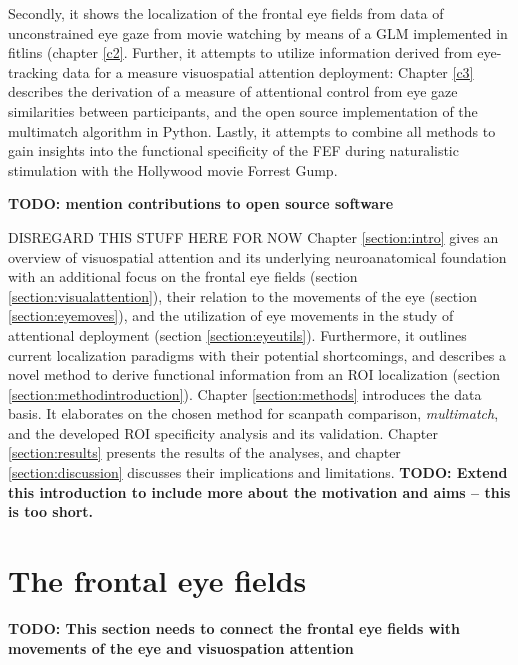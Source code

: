 \documentclass[a4paper, 12pt]{scrreprt}
\begin{document}
Secondly, it shows  the localization of the frontal eye fields from data of unconstrained eye gaze from movie watching by means of a GLM implemented in fitlins (chapter \ref{c2}. Further, it attempts to utilize information derived from eye-tracking data for a measure visuospatial attention deployment: Chapter \ref{c3} describes the derivation of a measure of attentional control from eye gaze similarities between participants, and the open source implementation of the multimatch algorithm in Python. Lastly, it attempts to combine all methods to gain insights into the functional specificity of the FEF during naturalistic stimulation with the Hollywood movie Forrest Gump. \newline


\textbf{TODO: mention contributions to open source software}

DISREGARD THIS STUFF HERE FOR NOW
Chapter \ref{section:intro} gives an overview of visuospatial attention and its underlying neuroanatomical foundation with an additional focus on the frontal eye fields (section \ref{section:visualattention}), their relation to the movements of the eye (section \ref{section:eyemoves}), and the utilization of eye movements in the study of attentional deployment (section \ref{section:eyeutils}). Furthermore, it outlines current localization paradigms with their potential shortcomings, and describes a novel method to derive functional information from an ROI localization (section \ref{section:methodintroduction}). Chapter \ref{section:methods} introduces the data basis. It elaborates on the chosen method for scanpath comparison, \textit{multimatch}, and the developed ROI specificity analysis and its validation. Chapter \ref{section:results} presents the results of the analyses, and chapter \ref{section:discussion} discusses their implications and limitations. \textbf{TODO: Extend this introduction to include more about the motivation and aims -- this is too short.}\pagebreak

\section{The frontal eye fields}
\textbf{TODO: This section needs to connect the frontal eye fields with movements of the eye and visuospation attention}
\end{document}
